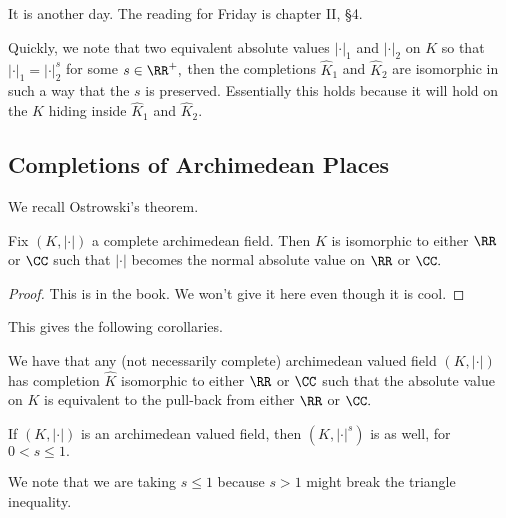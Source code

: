 \documentclass[../notes.tex]{subfiles}
\begin{document}
















It is another day. The reading for Friday is chapter II, \S4.

Quickly, we note that two equivalent absolute values $|\cdot|_1$ and $|\cdot|_2$ on $K$ so that $|\cdot|_1=|\cdot|_2^s$ for some $s\in\RR^+,$ then the completions $\hat K_1$ and $\hat K_2$ are isomorphic in such a way that the $s$ is preserved. Essentially this holds because it will hold on the $K$ hiding inside $\hat K_1$ and $\hat K_2.$

\subsection{Completions of Archimedean Places}
We recall Ostrowski's theorem.
\begin{theorem}[Ostrowski]
	Fix $(K,|\cdot|)$ a complete archimedean field. Then $K$ is isomorphic to either $\RR$ or $\CC$ such that $|\cdot|$ becomes the normal absolute value on $\RR$ or $\CC.$
\end{theorem}
\begin{proof}
	This is in the book. We won't give it here even though it is cool.
\end{proof}
This gives the following corollaries.
\begin{corollary}
	We have that any (not necessarily complete) archimedean valued field $(K,|\cdot|)$ has completion $\hat K$ isomorphic to either $\RR$ or $\CC$ such that the absolute value on $K$ is equivalent to the pull-back from either $\RR$ or $\CC.$
\end{corollary}
\begin{corollary}
	If $(K,|\cdot|)$ is an archimedean valued field, then $(K,|\cdot|^s)$ is as well, for $0<s\le1.$
\end{corollary}
We note that we are taking $s\le1$ because $s>1$ might break the triangle inequality.
\end{document}
